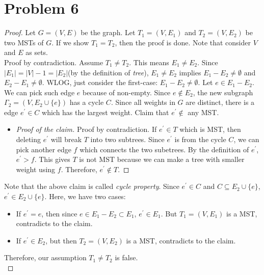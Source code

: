 \section*{Problem 6}
	\begin{proof}
		Let $G=(V, E)$ be the graph. Let $T_1 = (V, E_1)$ and $T_2=(V,E_2)$ be two MSTs of $G$. If we show $T_1 = T_2$, then the proof is done. Note that consider $V$ and $E$ as sets.\\
		Proof by contradiction. Assume $T_1 \neq T_2$. This means $E_1 \neq E_2$. Since $\left|E_1\right| = \left|V\right| - 1 = \left|E_2\right|$(by the definition of \textit{tree}), $E_1 \neq E_2$ implies $E_1 - E_2 \neq \emptyset$ and $E_2 - E_1 \neq \emptyset$. WLOG, just consider the first-case: $E_1 - E_2 \neq \emptyset$. Let $e\in E_1 - E_2$. We can pick such edge $e$ because of non-empty. Since $e \not\in E_2$, the new subgraph $\Gamma_2 = (V, E_2\cup\{e\})$ has a cycle $C$. Since all weights in $G$ are distinct, there is a edge $e^\prime\in C$ which has the largest weight. Claim that $e^\prime\not\in$ any MST.
		\begin{itemize}
			\item [] \begin{proof} [Proof of the claim]
				Proof by contradiction. If $e^\prime \in T$ which is MST, then deleting $e^\prime$ will break $T$ into two subtrees. Since $e^\prime$ is from the cycle $C$, we can pick another edge $f$ which connects the two subetrees. By the definition of $e^\prime$, $e^\prime>f$. This gives $T$ is not MST because we can make a tree with smaller weight using $f$. Therefore, $e^\prime\not\in T$.
			\end{proof}
		\end{itemize}
		Note that the above claim is called \textit{cycle property}. Since $e^\prime\in C$ and $C\subseteq E_2\cup\{e\}$, $e^\prime\in E_2\cup\{e\}$. Here, we have two cases:
		\begin{itemize}
			\item If $e^\prime = e$, then since $e\in E_1 - E_2\subset E_1$, $e^\prime \in E_1$. But $T_1 = (V, E_1)$ is a MST, contradicts to the claim.
			\item If $e^\prime \in E_2$, but then $T_2 = (V, E_2)$ is a MST, contradicts to the claim.
		\end{itemize}
		Therefore, our assumption $T_1 \neq T_2$ is false.\\
	\end{proof}